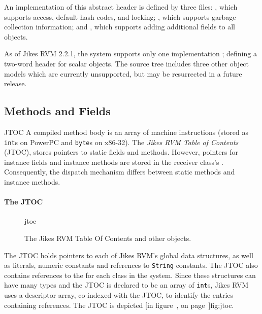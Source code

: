 An implementation of this abstract header is defined by three files: 
, which supports
 access, default hash codes, and locking; 
, which
supports garbage collection information; 
and 
, which supports
adding additional fields to all objects. 

As of Jikes RVM 2.2.1, the system supports only one implementation
; 
defining a two-word header for scalar objects.  The source tree includes
three other object models which are currently unsupported, but may be
resurrected in a future release.

\subsection{Methods and Fields}\label{sssec:methods}
\begin{Label}{JTOC}
A compiled method body is an array of machine instructions (stored as
{\tt int}s on PowerPC\TMweb{} and {\tt byte}s on x86-32). 
The {\em Jikes RVM Table of Contents} (JTOC),
stores pointers to static fields and methods.  However, 
pointers for instance fields and instance methods are stored in the receiver 
class's .  Consequently, the dispatch mechanism differs
between static methods and instance methods.
\end{Label}

\paragraph{The JTOC}
\begin{figure}[htb]
\begin{gif}{jtoc}
\vbox{
\hbox{}
}\hfil
\end{gif}
\caption{The Jikes RVM Table Of Contents and other objects.}
\label{fig:jtoc}
\end{figure}
%
%
%
The JTOC holds pointers to 
each of Jikes\TMweb{} RVM's global data structures, as well as
literals, numeric constants and references to \texttt{String} constants.
The JTOC also
contains references to the  for each class in the system.  
Since these 
structures can have many types and the JTOC is declared to be an array of 
{\tt int}s,  
Jikes RVM uses a descriptor array, co-indexed with the JTOC, 
to identify the entries containing references.
The JTOC
is depicted [in figure~\Ref, on page~\Pageref{}]{fig:jtoc}.  

